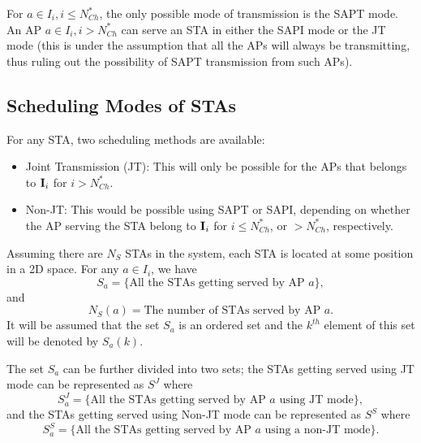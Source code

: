 For $a\in I_i, i\leq N_{Ch}^*$, the only possible mode of transmission is the SAPT mode. An AP $a\in I_i, i> N_{Ch}^*$ can serve an STA in either the SAPI mode or the JT mode (this is under the assumption that all the APs will always be transmitting, thus ruling out the possibility of SAPT transmission from such APs).





\subsection{Scheduling Modes of STAs}
\label{subsec:schedulingModesOfSTAs}
For any STA, two scheduling methods are available: 
\begin{itemize}
    \item Joint Transmission (JT): This will only be possible for the APs that belongs to $\textbf{I}_i$ for $i > N_{Ch}^*$.
    
    \item Non-JT: This would be possible using SAPT or SAPI, depending on whether the AP serving the STA belong to $\textbf{I}_i$ for $i \leq N_{Ch}^*$, or $ > N_{Ch}^*$, respectively.
\end{itemize}

Assuming there are $N_S$ STAs in the system, each STA is located at some position in a 2D space.
For any $a \in I_i$, we have
$$S_a = \{\text{All the STAs getting served by AP } a \},$$
and
$$N_S(a) = \text{The number of STAs served by AP } a.$$
It will be assumed that the set $S_a$ is an ordered set and the $k^{th}$ element of this set will be denoted by $S_a(k)$.

The set $S_a$ can be further divided into two sets; the STAs getting served using JT mode can be represented as $S^J$ where
\begin{equation*}
    S_a^J = \{\text{All the STAs getting served by AP } a \text{ using JT mode}\},
\end{equation*}
and the STAs getting served using Non-JT mode can be represented as $S^S$ where
\begin{equation*}
    S_a^S = \{\text{All the STAs getting served by AP } a \text{ using a non-JT mode}\}.
\end{equation*}

